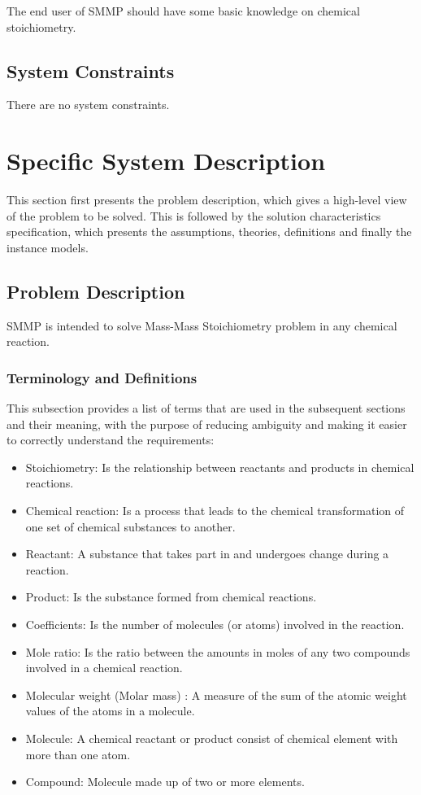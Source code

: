 \documentclass[12pt]{article}
\begin{document}
The end user of SMMP should have some basic knowledge on chemical stoichiometry.

\subsection{System Constraints}

There are no system constraints.

\section{Specific System Description}

This section first presents the problem description, which gives a high-level
view of the problem to be solved.  This is followed by the solution characteristics
specification, which presents the assumptions, theories, definitions and finally
the instance models.  

\subsection{Problem Description} \label{Sec_pd}

SMMP is intended to solve  Mass-Mass Stoichiometry problem in any chemical reaction. 

\subsubsection{Terminology and  Definitions}



This subsection provides a list of terms that are used in the subsequent
sections and their meaning, with the purpose of reducing ambiguity and making it
easier to correctly understand the requirements:

\begin{itemize}

\item Stoichiometry:  Is the relationship between reactants and products in chemical reactions.
\item Chemical reaction: Is a process that leads to the chemical transformation of one set of chemical substances to another.
\item Reactant: A substance that takes part in and undergoes change during a reaction.
\item Product:  Is the substance formed from chemical reactions.
\item Coefficients: Is the number of molecules (or atoms) involved in the reaction.
\item Mole ratio:  Is ​the ratio between the amounts in moles of any two compounds involved in a chemical reaction.
\item Molecular weight (Molar mass) :  A measure of the sum of the atomic weight values of the atoms in a molecule. 
\item Molecule: A chemical reactant or product consist of chemical element with more than one atom.
\item Compound: Molecule made up of two or more elements.
\end{itemize}
\end{document}
